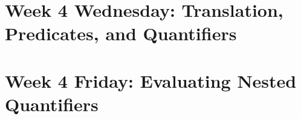 \section*{Week 4 Wednesday: Translation, Predicates, and Quantifiers}

\newpage


\newpage


\vfill


\newpage

\vfill

\vfill
\vfill

\vfill

\vfill
\newpage

\section*{Week 4 Friday: Evaluating Nested Quantifiers}


\newpage

\vfill

\newpage

\vfill

\newpage

\newpage

